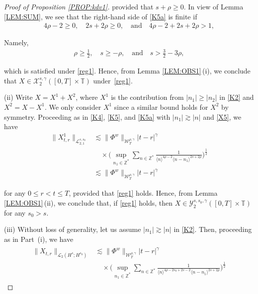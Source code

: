 \documentclass[letterpaper, 11pt,  reqno]{amsart}
\newcommand{\1}{\hspace{0.5mm}\text{I}\hspace{0.5mm}}
\newcommand{\noi}{\noindent}
\newcommand{\Z}{\mathbb{Z}}
\newcommand{\T}{\mathbb{T}}
\newcommand{\g}{\gamma}
\newcommand{\les}{\lesssim}
\newcommand{\ges}{\gtrsim}
\newcommand{\jb}[1]
{\langle #1 \rangle}
\newcommand{\cL}{\mathcal{L}}
\newcommand{\cX}{\mathcal{X}}
\newcommand{\cY}{\mathcal{Y}}
\newcommand{\W}{\mathcal{W}}
\numberwithin{equation}{section}
\numberwithin{theorem}{section}
\begin{document}
\begin{proof}[Proof of Proposition \ref{PROP:kdv1}]
\noi
provided that 
 $s + \rho \ge 0$.
 In view of Lemma \ref{LEM:SUM}, 
we see that the right-hand side of \eqref{K5a}
is finite if 
 \begin{align*}
4\rho- 2 \ge 0, \quad 2s + 2\rho  \ge 0, 
\quad \text{and}\quad 
 4\rho - 2 + 2s  +2\rho > 1, 
 \end{align*}

\noi
Namely, 
 \begin{align}
\rho \ge \frac 12, \quad s \ge - \rho,
\quad \text{and}\quad 
s > \frac 32 - 3 \rho, 
\label{K5b}
 \end{align}

\noi
which is satisfied under  \eqref{reg1}.
Hence,
from  Lemma \ref{LEM:OBS1}\,(i),  
we conclude that 
 $X\in  \cX^{s, \g}_2([0, T]\times \T)$ under~\eqref{reg1}.




\medskip

\noi
(ii)  Write $X = X^1 + X^2$, 
where $X^1$ is the contribution from $|n_1| \ge |n_2|$ in \eqref{K2}
and $X^2 = X - X^1$.
We only consider $X^1$ since a similar bound holds for $X^2$ by symmetry.
Proceeding as in \eqref{K4}, \eqref{K5}, and \eqref{K5a}
with $|n_1|\ges |n|$
and \eqref{X5}, 
we have 
\begin{align*}
\|X^1_{t,r} \|_{\cL_{2, 1}^{s, s_0}}
&\les
 \| \Phi^w \|_{\W_T^{\rho,\g}} 
  |t-r|^{\g} \\
  & \quad
  \times 
\bigg(
\sup_{n_1 \in \Z^*}
\sum_{n\in \Z^*}
 \frac{1}{\jb{n}^{4\rho- 2}\jb{n - n_1}^{2s +2\rho}}
\bigg)^\frac 12 \\
 &\les
 \| \Phi^w \|_{\W_T^{\rho,\g}} 
  |t-r|^{\g}
\end{align*}



\noi
for any $0 \le r <  t \le T$, 
provided that \eqref{reg1} holds.
Hence,
from  Lemma \ref{LEM:OBS1}\,(ii),  
we conclude that, if \eqref{reg1} holds, 
then
 $X\in  \cY^{s, s_0, \g}_2([0, T]\times \T)$
 for any $s_0 > s$.



\medskip

\noi
(iii) Without loss of generality, 
let us assume $|n_1|\ges |n|$ in \eqref{K2}.
Then, proceeding as in Part~(i), 
we have 
\begin{align}
\begin{aligned}
\|X_{t,r} \|_{\cL_2 (H^s; H^{s_0})}
&\les
 \| \Phi^w \|_{\W_T^{\rho,\g}} 
  |t-r|^{\g} \\
  & \quad
  \times 
\bigg(
\sup_{n_1 \in \Z^*}
\sum_{n\in \Z^*}
 \frac{1}{\jb{n}^{4\rho- 2s_0 + 2s- 2}\jb{n - n_1}^{2s +2\rho}}
\bigg)^\frac 12
\end{aligned}
\label{K6}
\end{align}


\end{proof}
\end{document}
